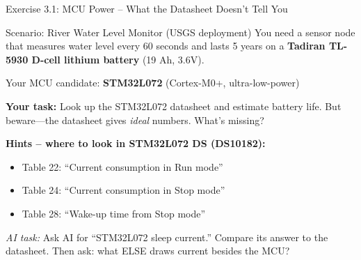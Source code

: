 \documentclass[aspectratio=169,11pt]{beamer}
\begin{document}
\begin{frame}{Exercise 3.1: MCU Power -- What the Datasheet Doesn't Tell You}
    \begin{block}{Scenario: River Water Level Monitor (USGS deployment)}
        You need a sensor node that measures water level every 60 seconds and lasts 5 years on a \textbf{Tadiran TL-5930 D-cell lithium battery} (19 Ah, 3.6V).
        
        \vspace{0.2cm}
        Your MCU candidate: \textbf{STM32L072} (Cortex-M0+, ultra-low-power)
        
        \vspace{0.2cm}
        \textbf{Your task:} Look up the STM32L072 datasheet and estimate battery life. But beware---the datasheet gives \textit{ideal} numbers. What's missing?
    \end{block}
    
    \vspace{0.2cm}
    \textbf{Hints -- where to look in STM32L072 DS (DS10182):}
    \begin{itemize}
        \item Table 22: ``Current consumption in Run mode''
        \item Table 24: ``Current consumption in Stop mode''
        \item Table 28: ``Wake-up time from Stop mode''
    \end{itemize}
    
    {\footnotesize \textit{AI task:} Ask AI for ``STM32L072 sleep current.'' Compare its answer to the datasheet. Then ask: what ELSE draws current besides the MCU?}
\end{frame}
\end{document}
